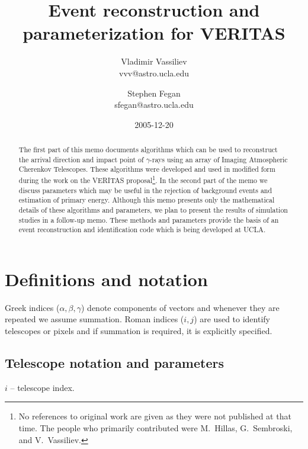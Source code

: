 \documentclass[letterpaper]{article}
\begin{document}
\title{Event reconstruction and parameterization for VERITAS}
\date{2005-12-20}
\author{Vladimir Vassiliev\\
vvv@astro.ucla.edu \and
Stephen Fegan\\
sfegan@astro.ucla.edu }
\maketitle
	
\begin{abstract}
The first part of this memo documents algorithms which can be used to
reconstruct the arrival direction and impact point of $\gamma$-rays
using an array of Imaging Atmospheric Cherenkov Telescopes. These
algorithms were developed and used in modified form during the work on
the VERITAS proposal\footnote{No references to original work are given
as they were not published at that time. The people who primarily
contributed were M.\ Hillas, G.\ Sembroski, and V.\ Vassiliev.}. In
the second part of the memo we discuss parameters which may be useful
in the rejection of background events and estimation of primary
energy. Although this memo presents only the mathematical details of
these algorithms and parameters, we plan to present the results of
simulation studies in a follow-up memo. These methods and parameters
provide the basis of an event reconstruction and identification code
which is being developed at UCLA.
\end{abstract}

%
%

\section{Definitions and notation}

Greek indices ($\alpha,\beta,\gamma$) denote components of vectors and
whenever they are repeated we assume summation. Roman indices ($i,j$)
are used to identify telescopes or pixels and if summation is
required, it is explicitly specified.

\subsection{Telescope notation and parameters}

$\displaystyle i$ -- telescope index.
\end{document}
